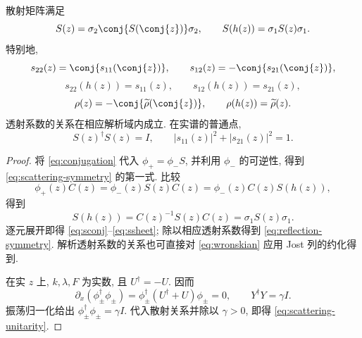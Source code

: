 \begin{proposition}[散射矩阵与反射数据的约化]\label{prop:scattering-symmetry}
散射矩阵满足
\begin{equation}\label{eq:scattering-symmetry}
S(z)=\sigma_2\conj{S(\conj{z})}\sigma_2,\qquad
S(h(z))=\sigma_1S(z)\sigma_1.
\end{equation}
特别地,
\begin{equation}\label{eq:sconj}
s_{22}(z)=\conj{s_{11}(\conj{z})},\qquad
s_{12}(z)=-\conj{s_{21}(\conj{z})},
\end{equation}
\begin{equation}\label{eq:ssheet}
s_{22}(h(z))=s_{11}(z),\qquad s_{12}(h(z))=s_{21}(z),
\end{equation}
\begin{equation}\label{eq:reflection-symmetry}
\rho(z)=-\conj{\widetilde\rho(\conj{z})},\qquad
\rho(h(z))=\widetilde\rho(z).
\end{equation}
透射系数的关系在相应解析域内成立. 在实谱的普通点,
\begin{equation}\label{eq:scattering-unitarity}
S(z)^\dagger S(z)=I,\qquad
|s_{11}(z)|^2+|s_{21}(z)|^2=1.
\end{equation}
\end{proposition}
\begin{proof}
将 \eqref{eq:conjugation} 代入 $\phi_+=\phi_-S$, 并利用 $\phi_-$ 的可逆性, 得到 \eqref{eq:scattering-symmetry} 的第一式. 比较
\[
\phi_+(z)C(z)=\phi_-(z)S(z)C(z)
=\phi_-(z)C(z)S(h(z)),
\]
得到
\[
S(h(z))=C(z)^{-1}S(z)C(z)=\sigma_1S(z)\sigma_1.
\]
逐元展开即得 \eqref{eq:sconj}--\eqref{eq:ssheet}; 除以相应透射系数得到 \eqref{eq:reflection-symmetry}. 解析透射系数的关系也可直接对 \eqref{eq:wronskian} 应用 Jost 列的约化得到.

在实 $z$ 上, $k,\lambda,F$ 为实数, 且 $U^\dagger=-U$. 因而
\[
\partial_x(\phi_\pm^\dagger\phi_\pm)
=\phi_\pm^\dagger(U^\dagger+U)\phi_\pm=0,\qquad
Y^\dagger Y=\gamma I.
\]
振荡归一化给出 $\phi_\pm^\dagger\phi_\pm=\gamma I$. 代入散射关系并除以 $\gamma>0$, 即得 \eqref{eq:scattering-unitarity}.
\end{proof}

